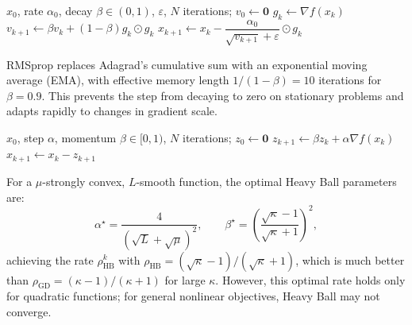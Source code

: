 \documentclass[11pt,a4paper]{article}
\theoremstyle{definition}
\begin{document}
\begin{algorithm}[H]
\caption{RMSprop}
\label{alg:rmsprop}
\begin{algorithmic}[1]
\Require $x_0$, rate $\alpha_0$, decay $\beta \in (0,1)$, $\varepsilon$, $N$ iterations; $v_0 \gets \mathbf{0}$
    \State $g_k \gets \nabla f(x_k)$
    \State $v_{k+1} \gets \beta v_k + (1 - \beta) g_k \odot g_k$ 
    \State $x_{k+1} \gets x_k - \dfrac{\alpha_0}{\sqrt{v_{k+1}} + \varepsilon} \odot g_k$
\EndFor
\end{algorithmic}
\end{algorithm}

RMSprop replaces Adagrad's cumulative sum with an exponential moving average (EMA), with effective memory length $1/(1-\beta) = 10$ iterations for $\beta = 0.9$. This prevents the step from decaying to zero on stationary problems and adapts rapidly to changes in gradient scale.

\begin{algorithm}[H]
\caption{Heavy Ball (Polyak Momentum)}
\label{alg:heavyball}
\begin{algorithmic}[1]
\Require $x_0$, step $\alpha$, momentum $\beta \in [0,1)$, $N$ iterations; $z_0 \gets \mathbf{0}$
    \State $z_{k+1} \gets \beta z_k + \alpha \nabla f(x_k)$ 
    \State $x_{k+1} \gets x_k - z_{k+1}$
\EndFor
\end{algorithmic}
\end{algorithm}

For a $\mu$-strongly convex, $L$-smooth function, the optimal Heavy Ball parameters are:
\begin{equation}
\alpha^{\star} = \frac{4}{(\sqrt{L}+\sqrt{\mu})^2}, \qquad \beta^{\star} = \left(\frac{\sqrt{\kappa}-1}{\sqrt{\kappa}+1}\right)^2,
\end{equation}
achieving the rate $\rho_{\text{HB}}^k$ with $\rho_{\text{HB}} = (\sqrt{\kappa}-1)/(\sqrt{\kappa}+1)$, which is much better than $\rho_{\text{GD}} = (\kappa-1)/(\kappa+1)$ for large $\kappa$. However, this optimal rate holds only for quadratic functions; for general nonlinear objectives, Heavy Ball may not converge.
\end{document}
